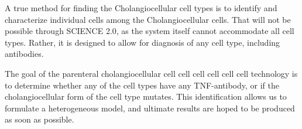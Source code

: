 \documentclass{article}
\begin{document}
A true method for finding the Cholangiocellular cell types is to identify and characterize individual cells among the Cholangiocellular cells. That will not be possible through SCIENCE 2.0, as the system itself cannot accommodate all cell types. Rather, it is designed to allow for diagnosis of any cell type, including antibodies.

The goal of the parenteral cholangiocellular cell cell cell cell cell cell technology is to determine whether any of the cell types have any TNF-antibody, or if the cholangiocellular form of the cell type mutates. This identification allows us to formulate a heterogeneous model, and ultimate results are hoped to be produced as soon as possible.
\end{document}
